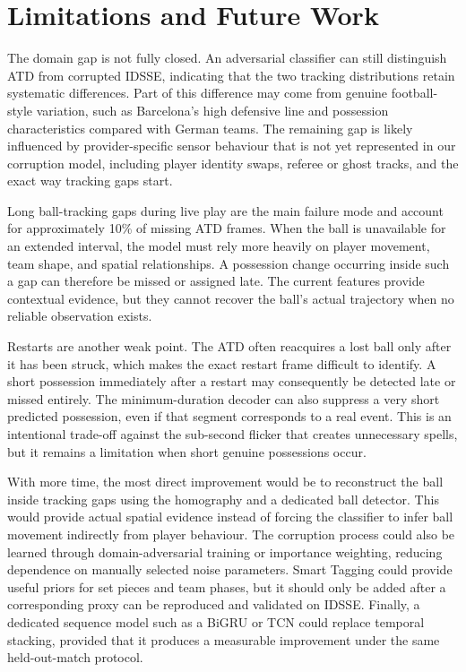 \documentclass[11pt,a4paper]{article}
\begin{document}

\section{Limitations and Future Work}

The domain gap is not fully closed. An adversarial classifier can still distinguish ATD from corrupted IDSSE, indicating that the two tracking distributions retain systematic differences. Part of this difference may come from genuine football-style variation, such as Barcelona's high defensive line and possession characteristics compared with German teams. The remaining gap is likely influenced by provider-specific sensor behaviour that is not yet represented in our corruption model, including player identity swaps, referee or ghost tracks, and the exact way tracking gaps start.

Long ball-tracking gaps during live play are the main failure mode and account for approximately 10\% of missing ATD frames. When the ball is unavailable for an extended interval, the model must rely more heavily on player movement, team shape, and spatial relationships. A possession change occurring inside such a gap can therefore be missed or assigned late. The current features provide contextual evidence, but they cannot recover the ball's actual trajectory when no reliable observation exists.

Restarts are another weak point. The ATD often reacquires a lost ball only after it has been struck, which makes the exact restart frame difficult to identify. A short possession immediately after a restart may consequently be detected late or missed entirely. The minimum-duration decoder can also suppress a very short predicted possession, even if that segment corresponds to a real event. This is an intentional trade-off against the sub-second flicker that creates unnecessary spells, but it remains a limitation when short genuine possessions occur.

With more time, the most direct improvement would be to reconstruct the ball inside tracking gaps using the homography and a dedicated ball detector. This would provide actual spatial evidence instead of forcing the classifier to infer ball movement indirectly from player behaviour. The corruption process could also be learned through domain-adversarial training or importance weighting, reducing dependence on manually selected noise parameters. Smart Tagging could provide useful priors for set pieces and team phases, but it should only be added after a corresponding proxy can be reproduced and validated on IDSSE. Finally, a dedicated sequence model such as a BiGRU or TCN could replace temporal stacking, provided that it produces a measurable improvement under the same held-out-match protocol.
\end{document}
